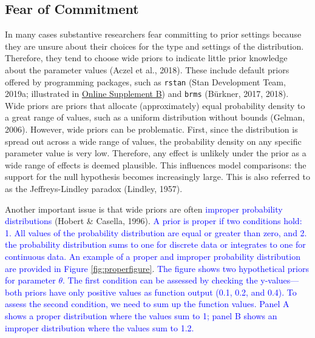 \documentclass[
  english,
  doc,floatsintext]{apa6}
\begin{document}
\hypertarget{fear-of-commitment}{%
\subsection{Fear of Commitment}\label{fear-of-commitment}}

In many cases substantive researchers fear committing to prior settings because they are unsure about their choices for the type and settings of the distribution. Therefore, they tend to choose wide priors to indicate little prior knowledge about the parameter values (Aczel et al., 2018). These include default priors offered by programming packages, such as \texttt{rstan} (Stan Development Team, 2019a; illustrated in \href{https://github.com/MyrtheV/Bayesian-Hierarchical-Modelling-An-Introduction-and-Reassessment/blob/main/B\%20-\%20Default\%20Priors\%20Rstan/Online-Supplement-B---Default-Priors-Rstan.pdf}{Online Supplement B}) and \texttt{brms} (Bürkner, 2017, 2018). Wide priors are priors that allocate (approximately) equal probability density to a great range of values, such as a uniform distribution without bounds (Gelman, 2006). However, wide priors can be problematic. First, since the distribution is spread out across a wide range of values, the probability density on any specific parameter value is very low. Therefore, any effect is unlikely under the prior as a wide range of effects is deemed plausible. This influences model comparisons: the support for the null hypothesis becomes increasingly large. This is also referred to as the Jeffreys-Lindley paradox (Lindley, 1957).

Another important issue is that wide priors are often \textcolor{blue}{improper probability distributions} (Hobert \& Casella, 1996). \textcolor{blue}{A prior is proper if two conditions hold: 1. All values of the probability distribution are equal or greater than zero, and 2. the probability distribution sums to one for discrete data or integrates to one for continuous data. An example of a proper and improper probability distribution are provided in Figure} \ref{fig:properfigure}. \textcolor{blue}{The figure shows two hypothetical priors for parameter $\theta$. The first condition can be assessed by checking the y-values---both priors have only positive values as function output (0.1, 0.2, and 0.4). To assess the second condition, we need to sum up the function values. Panel A shows a proper distribution where the values sum to 1; panel B shows an improper distribution where the values sum to 1.2.}
\end{document}
